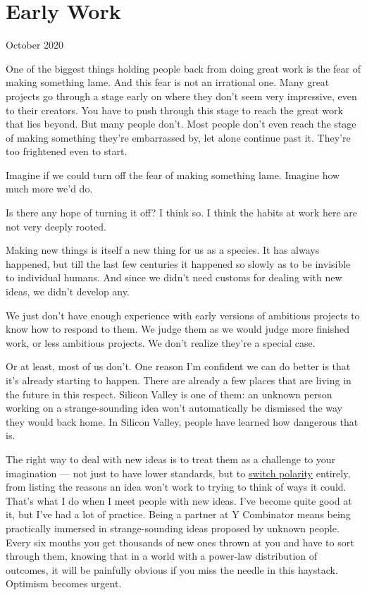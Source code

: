 \chapter{Early Work}

October 2020

One of the biggest things holding people back from doing great work is
the fear of making something lame. And this fear is not an irrational
one. Many great projects go through a stage early on where they don't
seem very impressive, even to their creators. You have to push through
this stage to reach the great work that lies beyond. But many people
don't. Most people don't even reach the stage of making something
they're embarrassed by, let alone continue past it. They're too
frightened even to start.

Imagine if we could turn off the fear of making something lame. Imagine
how much more we'd do.

Is there any hope of turning it off? I think so. I think the habits at
work here are not very deeply rooted.

Making new things is itself a new thing for us as a species. It has
always happened, but till the last few centuries it happened so slowly
as to be invisible to individual humans. And since we didn't need
customs for dealing with new ideas, we didn't develop any.

We just don't have enough experience with early versions of ambitious
projects to know how to respond to them. We judge them as we would judge
more finished work, or less ambitious projects. We don't realize they're
a special case.

Or at least, most of us don't. One reason I'm confident we can do better
is that it's already starting to happen. There are already a few places
that are living in the future in this respect. Silicon Valley is one of
them: an unknown person working on a strange-sounding idea won't
automatically be dismissed the way they would back home. In Silicon
Valley, people have learned how dangerous that is.

The right way to deal with new ideas is to treat them as a challenge to
your imagination --- not just to have lower standards, but to
\href{altair.html}{switch polarity} entirely, from listing the reasons
an idea won't work to trying to think of ways it could. That's what I do
when I meet people with new ideas. I've become quite good at it, but
I've had a lot of practice. Being a partner at Y Combinator means being
practically immersed in strange-sounding ideas proposed by unknown
people. Every six months you get thousands of new ones thrown at you and
have to sort through them, knowing that in a world with a power-law
distribution of outcomes, it will be painfully obvious if you miss the
needle in this haystack. Optimism becomes urgent.


